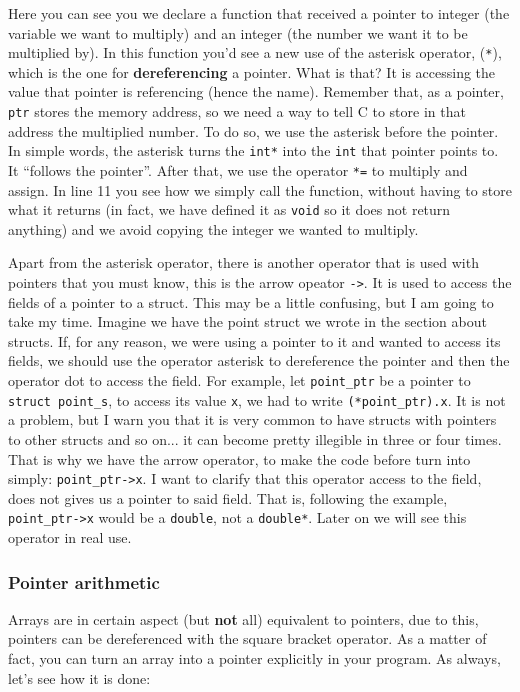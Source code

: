 \documentclass[a4paper]{article}
\begin{document}
Here you can see you we declare a function that received a pointer to integer
(the variable we want to multiply) and an integer (the number we want it to
be multiplied by). In this function you'd see a new use of the asterisk
operator, (\verb!*!), which is the one for \textbf{dereferencing} a pointer.
What is that? It is accessing the value that pointer is referencing (hence the
name). Remember that, as a pointer, \verb!ptr! stores the memory address, so we
need a way to tell C to store in that address the multiplied number. To do so,
we use the asterisk before the pointer. In simple words, the asterisk turns the
\verb!int*! into the \verb!int! that pointer points to. It ``follows the
pointer''. After that, we use the operator
\verb!*=! to multiply and assign. In line 11 you see how we simply call the
function, without having to store what it returns (in fact, we have defined it
as \verb!void! so it does not return anything) and we avoid copying the integer
we wanted to multiply.

Apart from the asterisk operator, there is another operator that is used with
pointers that you must know, this is the arrow opeator \verb!->!. It is used to
access the fields of a pointer to a struct. This may be a little confusing, but
I am going to take my time. Imagine we have the point struct we wrote in the
section about structs. If, for any reason, we were using a pointer to it and
wanted to access its fields, we should use the operator asterisk to dereference
the pointer and then the operator dot to access the field. For example, let
\verb!point_ptr! be a pointer to \verb!struct point_s!, to access its value
\verb!x!, we had to write \verb!(*point_ptr).x!. It is not a problem, but I warn
you that it is very common to have structs with pointers to other structs and so
on... it can become pretty illegible in three or four times. That is why we have
the arrow operator, to make the code before turn into simply:
\verb!point_ptr->x!. I want to clarify that this operator access to the field,
does not gives us a pointer to said field. That is, following the example,
\verb!point_ptr->x! would be a \verb!double!, not a \verb!double*!. Later on we
will see this operator in real use.

\subsubsection{Pointer arithmetic}
Arrays are in certain aspect (but \textbf{not} all) equivalent to pointers, due
to this, pointers can be dereferenced with the square bracket operator. As a
matter of fact, you can turn an array into a pointer explicitly in your program.
As always, let's see how it is done:
\end{document}
